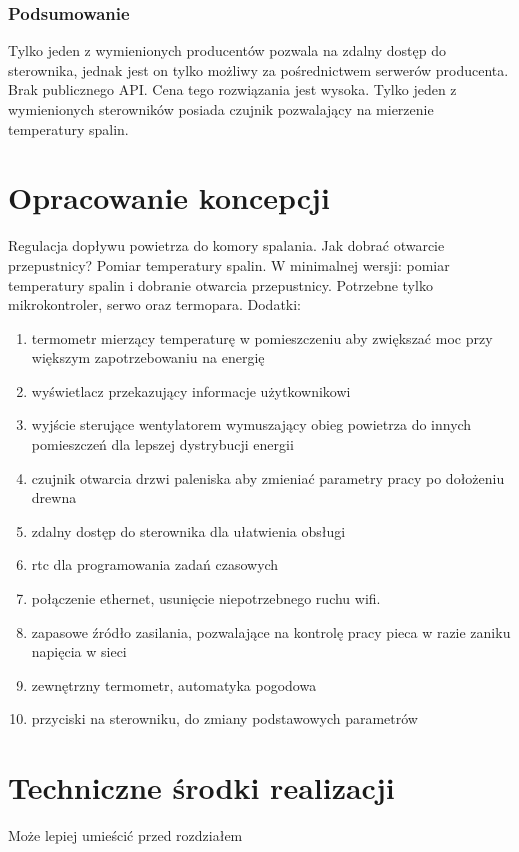 \documentclass[12pt]{report}
\begin{document}
  \subsection{Podsumowanie}
  Tylko jeden z wymienionych producentów pozwala na zdalny dostęp do sterownika, jednak jest on tylko możliwy za pośrednictwem serwerów producenta. Brak publicznego API. Cena tego rozwiązania jest wysoka.
  Tylko jeden z wymienionych sterowników posiada czujnik pozwalający na mierzenie temperatury spalin.
  
 \chapter{Opracowanie koncepcji}
 Regulacja dopływu powietrza do komory spalania. Jak dobrać otwarcie przepustnicy? Pomiar temperatury spalin.
 W minimalnej wersji: pomiar temperatury spalin i dobranie otwarcia przepustnicy. Potrzebne tylko mikrokontroler, serwo oraz termopara.
 Dodatki:
 \begin{enumerate}
 \item termometr mierzący temperaturę w pomieszczeniu aby zwiększać moc przy większym zapotrzebowaniu na energię
 \item wyświetlacz przekazujący informacje użytkownikowi
 \item wyjście sterujące wentylatorem wymuszający obieg powietrza do innych pomieszczeń dla lepszej dystrybucji energii
 \item czujnik otwarcia drzwi paleniska aby zmieniać parametry pracy po dołożeniu drewna
 \item zdalny dostęp do sterownika dla ułatwienia obsługi
 \item rtc dla programowania zadań czasowych
 \item połączenie ethernet, usunięcie niepotrzebnego ruchu wifi.
 \item zapasowe źródło zasilania, pozwalające na kontrolę pracy pieca w razie zaniku napięcia w sieci
 \item zewnętrzny termometr, automatyka pogodowa
 \item przyciski na sterowniku, do zmiany podstawowych parametrów
 \end{enumerate}  
 
 
 \chapter{Techniczne środki realizacji}
 Może lepiej umieścić przed rozdziałem \label{rozdz.stworzenie}
 
\end{document}

